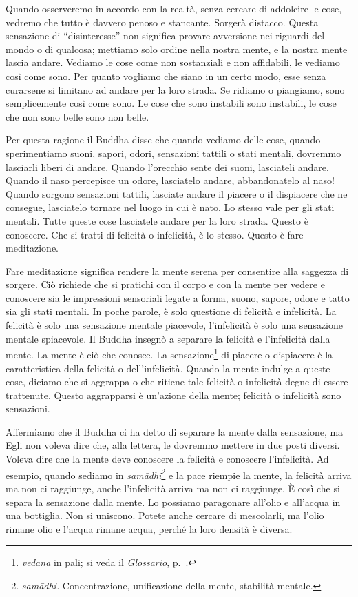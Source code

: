 Quando osserveremo in accordo con la realtà, senza cercare di addolcire
le cose, vedremo che tutto è davvero penoso e stancante. Sorgerà
distacco. Questa sensazione di ``disinteresse'' non significa provare
avversione nei riguardi del mondo o di qualcosa; mettiamo solo ordine
nella nostra mente, e la nostra mente lascia andare. Vediamo le cose
come non sostanziali e non affidabili, le vediamo così come sono. Per
quanto vogliamo che siano in un certo modo, esse senza curarsene si
limitano ad andare per la loro strada. Se ridiamo o piangiamo, sono
semplicemente così come sono. Le cose che sono instabili sono instabili,
le cose che non sono belle sono non belle.

Per questa ragione il Buddha disse che quando vediamo delle cose, quando
sperimentiamo suoni, sapori, odori, sensazioni tattili o stati mentali,
dovremmo lasciarli liberi di andare. Quando l'orecchio sente dei suoni,
lasciateli andare. Quando il naso percepisce un odore, lasciatelo
andare, abbandonatelo al naso! Quando sorgono sensazioni tattili,
lasciate andare il piacere o il dispiacere che ne consegue, lasciatelo
tornare nel luogo in cui è nato. Lo stesso vale per gli stati mentali.
Tutte queste cose lasciatele andare per la loro strada. Questo è
conoscere. Che si tratti di felicità o infelicità, è lo stesso. Questo è
fare meditazione.

Fare meditazione significa rendere la mente serena per consentire alla
saggezza di sorgere. Ciò richiede che si pratichi con il corpo e con la
mente per vedere e conoscere sia le impressioni sensoriali legate a
forma, suono, sapore, odore e tatto sia gli stati mentali. In poche
parole, è solo questione di felicità e infelicità. La felicità è solo
una sensazione mentale piacevole, l'infelicità è solo una sensazione
mentale spiacevole. Il Buddha insegnò a separare la felicità e
l'infelicità dalla mente. La mente è ciò che conosce. La
sensazione\footnote{\emph{vedanā} in pāli; si veda il \emph{Glossario}, p.~\pageref{glossary-vedana}.}
di piacere o dispiacere è la caratteristica della felicità o
dell'infelicità. Quando la mente indulge a queste cose, diciamo che si
aggrappa o che ritiene tale felicità o infelicità degne di essere
trattenute. Questo aggrapparsi è un'azione della mente; felicità o
infelicità sono sensazioni.

Affermiamo che il Buddha ci ha detto di separare la mente dalla
sensazione, ma Egli non voleva dire che, alla lettera, le dovremmo
mettere in due posti diversi. Voleva dire che la mente deve conoscere la
felicità e conoscere l'infelicità. Ad esempio, quando sediamo in
\emph{samādhi}\footnote{\emph{samādhi.} Concentrazione, unificazione
  della mente, stabilità mentale.} e la pace riempie la mente, la
felicità arriva ma non ci raggiunge, anche l'infelicità arriva ma non ci
raggiunge. È così che si separa la sensazione dalla mente. Lo possiamo
paragonare all'olio e all'acqua in una bottiglia. Non si uniscono.
Potete anche cercare di mescolarli, ma l'olio rimane olio e l'acqua
rimane acqua, perché la loro densità è diversa.

